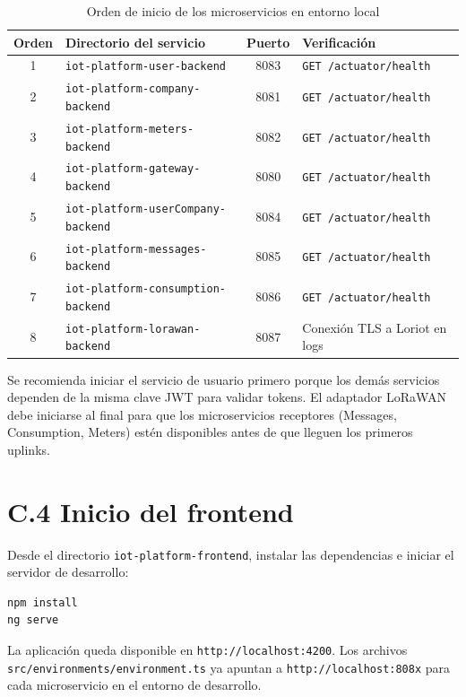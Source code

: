 \documentclass[12pt,a4paper,oneside]{report}
\begin{document}
\begin{table}[H]
\centering
\caption{Orden de inicio de los microservicios en entorno local}\label{tab:orden-inicio}
\begin{tabularx}{\textwidth}{clcX}
\toprule
\textbf{Orden} & \textbf{Directorio del servicio} & \textbf{Puerto} & \textbf{Verificación} \\
\midrule
1 & \texttt{iot-platform-user-backend} & 8083 & \texttt{GET /actuator/health} \\
2 & \texttt{iot-platform-company-backend} & 8081 & \texttt{GET /actuator/health} \\
3 & \texttt{iot-platform-meters-backend} & 8082 & \texttt{GET /actuator/health} \\
4 & \texttt{iot-platform-gateway-backend} & 8080 & \texttt{GET /actuator/health} \\
5 & \texttt{iot-platform-userCompany-backend} & 8084 & \texttt{GET /actuator/health} \\
6 & \texttt{iot-platform-messages-backend} & 8085 & \texttt{GET /actuator/health} \\
7 & \texttt{iot-platform-consumption-backend} & 8086 & \texttt{GET /actuator/health} \\
8 & \texttt{iot-platform-lorawan-backend} & 8087 & Conexión TLS a Loriot en logs \\
\bottomrule
\end{tabularx}
\end{table}

Se recomienda iniciar el servicio de usuario primero porque los demás servicios dependen de la misma clave JWT para validar tokens. El adaptador LoRaWAN debe iniciarse al final para que los microservicios receptores (Messages, Consumption, Meters) estén disponibles antes de que lleguen los primeros uplinks.

\section*{C.4 Inicio del frontend}

Desde el directorio \texttt{iot-platform-frontend}, instalar las dependencias e iniciar el servidor de desarrollo:

\begin{verbatim}
npm install
ng serve
\end{verbatim}

La aplicación queda disponible en \texttt{http://localhost:4200}. Los archivos \texttt{src/environments/environment.ts} ya apuntan a \texttt{http://localhost:808x} para cada microservicio en el entorno de desarrollo.
\end{document}
